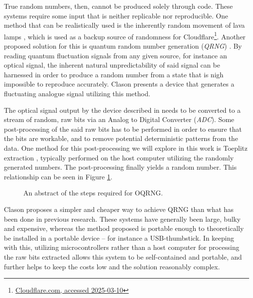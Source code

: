 \documentclass{sigchi}
\begin{document}
True random numbers, then, cannot be produced solely through code. These systems require some input that is neither replicable nor reproducible. One method that can be realistically used is the inherently random movement of lava lamps \cite{lavarand}, which is used as a backup source of randomness for Cloudflare\footnote{\href{https://blog.cloudflare.com/randomness-101-lavarand-in-production/}{Cloudflare.com, accessed 2025-03-10}}. Another proposed solution for this is quantum random number generation (\emph{QRNG}) \cite{QRNG}. By reading quantum fluctuation signals from any given source, for instance an optical signal, the inherent natural unpredictability of said signal can be harnessed in order to produce a random number from a state that is nigh impossible to reproduce accurately. Clason \cite{Clason2023} presents a device that generates a fluctuating analogue signal utilizing this method.

The optical signal output by the device described in \cite{Clason2023} needs to be converted to a stream of random, raw bits via an Analog to Digital Converter (\emph{ADC}). Some post-processing of the said raw bits has to be performed in order to ensure that the bits are workable, and to remove potential deterministic patterns from the data. One method for this post-processing we will explore in this work is Toeplitz extraction \cite{toeplitz}, typically performed on the host computer utilizing the randomly generated numbers. The post-processing finally yields a random number. This relationship can be seen in Figure \ref{fig:linear-system}.

\begin{figure}[ht] \centering {} \caption{An abstract of the steps required for OQRNG.}
\label{fig:linear-system} \end{figure}

Clason proposes a simpler and cheaper way to achieve QRNG \cite{Clason2023} than what has been done in previous research. These systems have generally been large, bulky and expensive, whereas the method proposed is portable enough to theoretically be installed in a portable device -- for instance a USB-thumbstick. In keeping with this, utilizing microcontrollers rather than a host computer for processing the raw bits extracted allows this system to be self-contained and portable, and further helps to keep the costs low and the solution reasonably complex.
\end{document}
